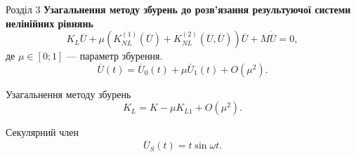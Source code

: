 \documentclass[8pt]{beamer}
\numberwithin{figure}{section}
\numberwithin{equation}{section}
\numberwithin{table}{section}
\begin{document}
\begin{frame}{Розділ 3}
\textbf{Узагальнення методу збурень до розв’язання результуючої системи нелінійних рівнянь}
\begin{equation}\label{eq:nonlineq}
K_L\overline{U}+\mu \left( K_{NL}^{(1)}\left( \overline{U}\right)+K_{NL}^{(2)}\left( \overline{U},\overline{U}\right) \right)\overline{U}+M\ddot{\overline{U}}=0,
\end{equation}
де $\mu \in [0;1]$ --- параметр збурення.
\begin{equation}
\overline{U}\left(t\right) =\overline{U}_0\left(t\right) + \mu \overline{U}_1\left(t\right) + O\left( \mu^2\right).
\end{equation}

Узагальнення методу збурень
\begin{equation}
K_L = K - \mu K_{L1} + O\left( \mu^2\right).
\end{equation}

Секулярний член
\begin{equation}
\overline{U}_S\left(t\right) = t \sin \omega t.
\end{equation}

\end{frame}
\end{document}
